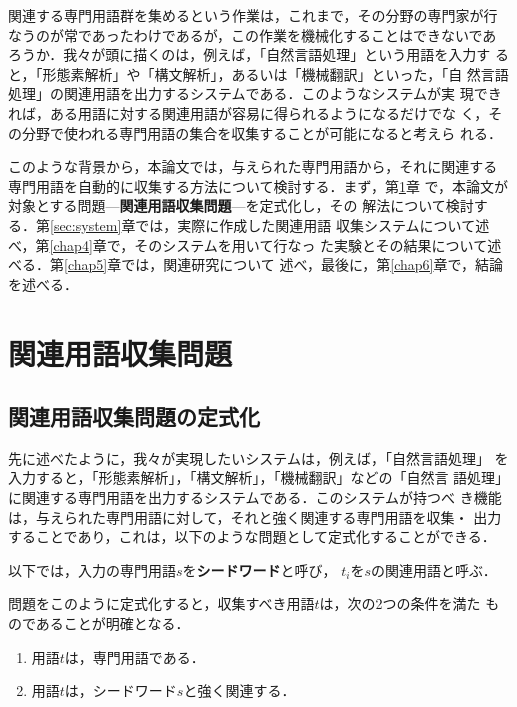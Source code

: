 関連する専門用語群を集めるという作業は，これまで，その分野の専門家が行
なうのが常であったわけであるが，この作業を機械化することはできないであ
ろうか．我々が頭に描くのは，例えば，「自然言語処理」という用語を入力す
ると，「形態素解析」や「構文解析」，あるいは「機械翻訳」といった，「自
然言語処理」の関連用語を出力するシステムである．このようなシステムが実
現できれば，ある用語に対する関連用語が容易に得られるようになるだけでな
く，その分野で使われる専門用語の集合を収集することが可能になると考えら
れる．

このような背景から，本論文では，与えられた専門用語から，それに関連する
専門用語を自動的に収集する方法について検討する．まず，第\ref{chap2}章
で，本論文が対象とする問題---{\bf 関連用語収集問題}---を定式化し，その
解法について検討する．第\ref{sec:system}章では，実際に作成した関連用語
収集システムについて述べ，第\ref{chap4}章で，そのシステムを用いて行なっ
た実験とその結果について述べる．第\ref{chap5}章では，関連研究について
述べ，最後に，第\ref{chap6}章で，結論を述べる．


\section{関連用語収集問題} \label{chap2}

\subsection{関連用語収集問題の定式化}

先に述べたように，我々が実現したいシステムは，例えば，「自然言語処理」
を入力すると，「形態素解析」，「構文解析」，「機械翻訳」などの「自然言
語処理」に関連する専門用語を出力するシステムである．このシステムが持つべ
き機能は，与えられた専門用語に対して，それと強く関連する専門用語を収集・
出力することであり，これは，以下のような問題として定式化することができる．

\vspace{2mm}
\begin{quote}
\end{quote}
\vspace{2mm}
以下では，入力の専門用語$s$を{\bf シードワード}と呼び，
$t_i$を$s$の関連用語と呼ぶ．

問題をこのように定式化すると，収集すべき用語$t$は，次の2つの条件を満た
ものであることが明確となる．
\begin{enumerate}
 \item 用語$t$は，専門用語である．
 \item 用語$t$は，シードワード$s$と強く関連する．
\end{enumerate}

